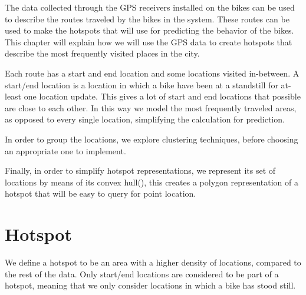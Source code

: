The data collected through the GPS receivers installed on the bikes can be used to describe the routes traveled by the bikes in the system.
These routes can be used to make the hotspots that \projectname{} will use for predicting the behavior of the bikes.
This chapter will explain how we will use the GPS data to create hotspots that describe the most frequently visited places in the city.

Each route has a start and end location and some locations visited in-between. A start/end location is a location in which a bike have been at a standstill for at-least one location update.
This gives a lot of start and end locations that possible are close to each other.
In this way we model the most frequently traveled areas, as opposed to every single location, simplifying the calculation for prediction.

In order to group the locations, we explore clustering techniques, before choosing an appropriate one to implement.

Finally, in order to simplify hotspot representations, we represent its set of locations by means of its convex hull(\citet[section 33.3]{aadbook}), this creates a polygon representation of a hotspot that will be easy to query for point location.

\section{Hotspot}\label{hotspot}
We define a hotspot to be an area with a higher density of locations, compared to the rest of the data. Only start/end locations are considered to be part of a hotspot, meaning that we only consider locations in which a bike has stood still.
